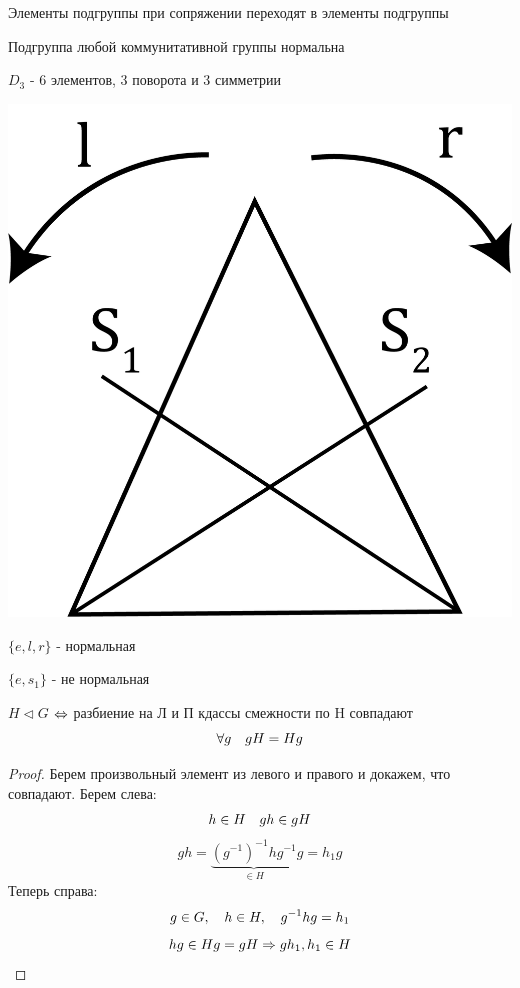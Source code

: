 \documentclass[12pt, fleqn]{article}
\begin{document}
\begin{remark}
    Элементы подгруппы при сопряжении переходят в элементы подгруппы
\end{remark}

\begin{remark}
    Подгруппа любой коммунитативной группы нормальна
\end{remark}

\begin{example}
    $D_3$ - 6 элементов, 3 поворота и 3 симметрии

    \includegraphics[scale=0.3]{pics/triangle_d_3.png}

    $\{e,l,r\}$ - нормальная

    $\{e, s_1\}$ - не нормальная
\end{example}

\begin{utv}
    $H \triangleleft G$ $\Leftrightarrow$ разбиение на Л и П кдассы смежности по H совпадают
    \[\forall g \quad gH = Hg\]
\end{utv}

\begin{proof}
    Берем произвольный элемент из левого и правого и докажем, что совпадают. Берем слева:
    \[h \in H \quad g h \in g H\]
    \[g h = \underbrace{(g^{-1})^{-1} h g^{-1}}_{\in H} g = h_1 g\]
    Теперь справа:
    \[g \in G,\quad h \in H,\quad g^{-1}h g=h_1\]
    \[h g \in H g = g H \Rightarrow g h_1, h_1 \in H\]
\end{proof}
\end{document}
